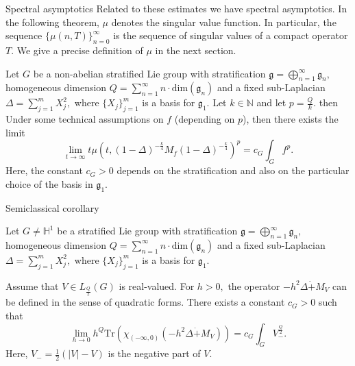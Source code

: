 \documentclass{beamer}
\numberwithin{equation}{section}
\theoremstyle{plain}
\theoremstyle{plain}
\theoremstyle{definition}
\theoremstyle{plain}
\theoremstyle{plain}
\theoremstyle{definition}
\newcommand{\Tr}{\mathrm{Tr}}
\newcommand{\gf}{\mathfrak{g}}
\begin{document}
\begin{frame}{Spectral asymptotics}
Related to these estimates we have spectral asymptotics. In the following theorem, $\mu$ denotes the singular value function. In particular, the sequence $\{\mu(n,T)\}_{n=0}^\infty$ is the sequence of singular values of a compact operator $T.$ We give a precise definition of $\mu$ in the next section.
\begin{theorem}\label{main_asymptotic_formula}
Let $G$ be a non-abelian stratified Lie group with stratification $\gf = \bigoplus_{n=1}^\infty \gf_n,$ homogeneous dimension $Q = \sum_{n=1}^\infty n\cdot \mathrm{dim}(\gf_n)$
and a fixed sub-Laplacian $\Delta = \sum_{j=1}^m X_j^2,$ where $\{X_j\}_{j=1}^m$ is a basis for $\gf_1.$ Let $k\in\mathbb{N}$ and let $p=\frac{Q}{k}.$
then {\color{red} Under some technical assumptions on $f$ (depending on $p$),}
then there exists the limit
$$\lim_{t\to\infty} t\mu(t,(1-\Delta)^{-\frac{k}{4}}M_f(1-\Delta)^{-\frac{k}{4}})^p=c_G\int_G f^p.$$
Here, the constant $c_G>0$ depends on the stratification and also on the particular choice of the basis in $\gf_1.$
\end{theorem}
\end{frame}


\begin{frame}{Semiclassical corollary}
\begin{corollary}
    Let $G\neq\mathbb{H}^1$ be a stratified Lie group with stratification $\gf = \bigoplus_{n=1}^\infty \gf_n,$ homogeneous dimension $Q = \sum_{n=1}^\infty n\cdot \mathrm{dim}(\gf_n)$
    and a fixed sub-Laplacian $\Delta = \sum_{j=1}^m X_j^2,$ where $\{X_j\}_{j=1}^m$ is a basis for $\gf_1.$

    Assume that $V\in L_{\frac{Q}{2}}(G)$ is real-valued. For $h>0,$ the operator $-h^2\Delta\dot{+}M_V$ can be defined in the sense of quadratic forms.
    There exists a constant $c_{G}>0$ such that
    \[
        \lim_{h\to 0} h^{Q}\Tr(\chi_{(-\infty,0)}(-h^2\Delta\dot{+}M_V)) = c_{G}\int_{G} V_-^{\frac{Q}{2}}.
    \]
    Here, $V_- = \frac{1}{2}(|V|-V)$ is the negative part of $V.$
\end{corollary}
\end{frame}
\end{document}
